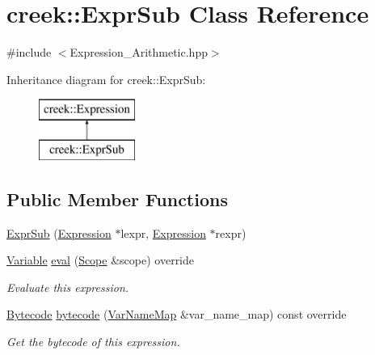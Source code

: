 \hypertarget{classcreek_1_1_expr_sub}{}\section{creek\+:\+:Expr\+Sub Class Reference}
\label{classcreek_1_1_expr_sub}


{\ttfamily \#include $<$Expression\+\_\+\+Arithmetic.\+hpp$>$}

Inheritance diagram for creek\+:\+:Expr\+Sub\+:\begin{figure}[H]
\begin{center}
\leavevmode
\includegraphics[height=2.000000cm]{classcreek_1_1_expr_sub}
\end{center}
\end{figure}
\subsection*{Public Member Functions}
\begin{DoxyCompactItemize}
\item 
\hyperlink{classcreek_1_1_expr_sub_ae49e9b5c9ee1a48ab453ed203fc4a557}{Expr\+Sub} (\hyperlink{classcreek_1_1_expression}{Expression} $\ast$lexpr, \hyperlink{classcreek_1_1_expression}{Expression} $\ast$rexpr)
\item 
\hyperlink{classcreek_1_1_variable}{Variable} \hyperlink{classcreek_1_1_expr_sub_a2b80d9d6dcfbab85df41674e73b02625}{eval} (\hyperlink{classcreek_1_1_scope}{Scope} \&scope) override
\begin{DoxyCompactList}\small\item\em Evaluate this expression. \end{DoxyCompactList}\item 
\hyperlink{classcreek_1_1_bytecode}{Bytecode} \hyperlink{classcreek_1_1_expr_sub_a243b665c230c0cba33315706b746732d}{bytecode} (\hyperlink{classcreek_1_1_var_name_map}{Var\+Name\+Map} \&var\+\_\+name\+\_\+map) const  override\hypertarget{classcreek_1_1_expr_sub_a243b665c230c0cba33315706b746732d}{}\label{classcreek_1_1_expr_sub_a243b665c230c0cba33315706b746732d}

\begin{DoxyCompactList}\small\item\em Get the bytecode of this expression. \end{DoxyCompactList}\end{DoxyCompactItemize}


